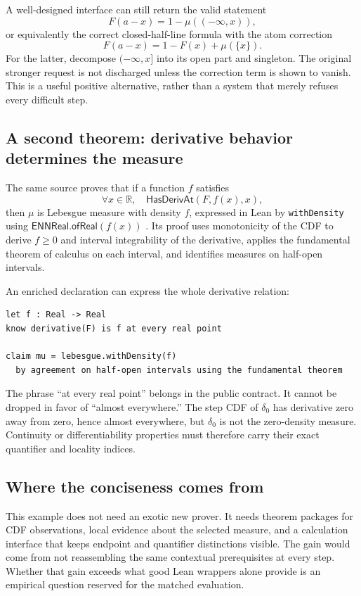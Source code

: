 \documentclass[11pt,a4paper]{article}
\newcommand{\code}[1]{\nolinkurl{#1}}
\newcommand{\R}{\mathbb R}\newcommand{\Q}{\mathbb Q}
\theoremstyle{plain}
\theoremstyle{definition}
\theoremstyle{remark}
\begin{document}
A well-designed interface can still return the valid statement
\[
 F(a-x)=1-\mu(({-}\infty,x)),
\]
or equivalently the correct closed-half-line formula with the atom correction
\[
 F(a-x)=1-F(x)+\mu(\{x\}).
\]
For the latter, decompose $({-}\infty,x]$ into its open part and singleton.
The original stronger request is not discharged unless the correction term
is shown to vanish. This is a useful positive alternative, rather than a
system that merely refuses every difficult step.

\subsection{A second theorem: derivative behavior determines the measure}
The same source proves that if a function $f$ satisfies
\[
 \forall x\in\R,\quad \mathsf{HasDerivAt}(F,f(x),x),
\]
then $\mu$ is Lebesgue measure with density $f$, expressed in Lean by
\code{withDensity} using $\mathsf{ENNReal.ofReal}(f(x))$
\cite{cdfsource}. Its proof uses monotonicity of the CDF to derive
$f\ge0$ and interval integrability of the derivative, applies the fundamental
theorem of calculus on each interval, and identifies measures on half-open
intervals.

An enriched declaration can express the whole derivative relation:
\par\noindent\begin{minipage}{\linewidth}
\begin{lstlisting}
let f : Real -> Real
know derivative(F) is f at every real point

claim mu = lebesgue.withDensity(f)
  by agreement on half-open intervals using the fundamental theorem
\end{lstlisting}
\end{minipage}\par

The phrase ``at every real point'' belongs in the public contract. It cannot
be dropped in favor of ``almost everywhere.'' The step CDF of $\delta_0$ has
derivative zero away from zero, hence almost everywhere, but $\delta_0$ is
not the zero-density measure. Continuity or differentiability properties
must therefore carry their exact quantifier and locality indices.

\subsection{Where the conciseness comes from}
This example does not need an exotic new prover. It needs theorem packages
for CDF observations, local evidence about the selected measure, and a
calculation interface that keeps endpoint and quantifier distinctions visible.
The gain would come from not reassembling the same contextual prerequisites
at every step. Whether that gain exceeds what good Lean wrappers alone provide
is an empirical question reserved for the matched evaluation.
\end{document}
